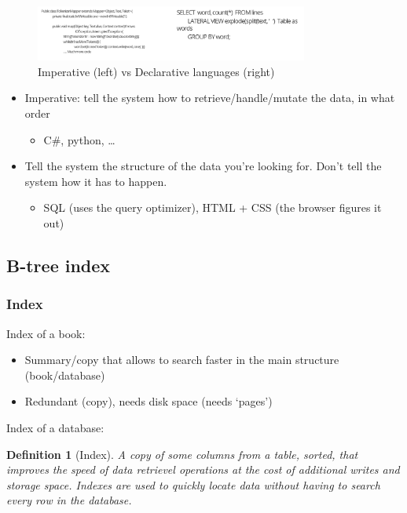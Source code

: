 \documentclass{article}
\newtheorem{theorem}{Definition}[section]
\begin{document}
\begin{figure}[H]
    \centering
    \includegraphics[width=0.8\textwidth]{imperative-vs-declarative.png}
    \caption{Imperative (left) vs Declarative languages (right)}
\end{figure}

\begin{itemize}
    \item Imperative: tell the system how to retrieve/handle/mutate the data, in what order
    \begin{itemize}
        \item C\#, python, \dots
    \end{itemize}
    \item Tell the system the structure of the data you're looking for. Don't tell the system how it has to happen. 
    \begin{itemize}
        \item SQL (uses the query optimizer), HTML + CSS (the browser figures it out)
    \end{itemize}
\end{itemize}

\subsection{B-tree index}

\subsubsection{Index}

Index of a book:

\begin{itemize}
    \item Summary/copy that allows to search faster in the main structure (book/database)
    \item Redundant (copy), needs disk space (needs `pages')
\end{itemize}

Index of a database:

\begin{theorem}[Index]
    A copy of some columns from a table, sorted, that improves the speed of data retrievel operations at the cost of additional writes and storage space.
    Indexes are used to quickly locate data without having to search every row in the database.
\end{theorem}
\end{document}
